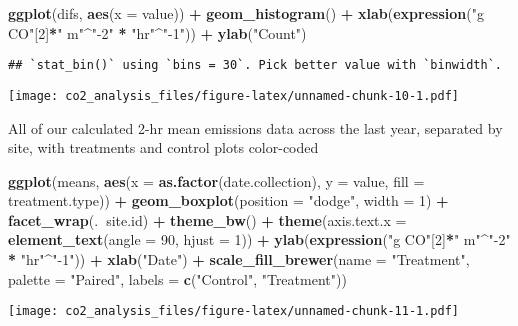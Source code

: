 \documentclass[]{article}
\newenvironment{Shaded}{\begin{snugshade}}{\end{snugshade}}
\newcommand{\KeywordTok}[1]{\textcolor[rgb]{0.13,0.29,0.53}{\textbf{#1}}}
\newcommand{\DataTypeTok}[1]{\textcolor[rgb]{0.13,0.29,0.53}{#1}}
\newcommand{\DecValTok}[1]{\textcolor[rgb]{0.00,0.00,0.81}{#1}}
\newcommand{\StringTok}[1]{\textcolor[rgb]{0.31,0.60,0.02}{#1}}
\newcommand{\OperatorTok}[1]{\textcolor[rgb]{0.81,0.36,0.00}{\textbf{#1}}}
\newcommand{\NormalTok}[1]{#1}
\begin{document}
\begin{Shaded}
\begin{Highlighting}[]
\KeywordTok{ggplot}\NormalTok{(difs, }\KeywordTok{aes}\NormalTok{(}\DataTypeTok{x =}\NormalTok{ value)) }\OperatorTok{+}
\StringTok{  }\KeywordTok{geom_histogram}\NormalTok{() }\OperatorTok{+}
\StringTok{  }\KeywordTok{xlab}\NormalTok{(}\KeywordTok{expression}\NormalTok{(}\StringTok{"g CO"}\NormalTok{[}\DecValTok{2}\NormalTok{]}\OperatorTok{*}\StringTok{" m"}\OperatorTok{^}\StringTok{"-2"} \OperatorTok{*}\StringTok{ "hr"}\OperatorTok{^}\StringTok{"-1"}\NormalTok{)) }\OperatorTok{+}
\StringTok{  }\KeywordTok{ylab}\NormalTok{(}\StringTok{"Count"}\NormalTok{)}
\end{Highlighting}
\end{Shaded}

\begin{verbatim}
## `stat_bin()` using `bins = 30`. Pick better value with `binwidth`.
\end{verbatim}

\texttt{[image: co2\_analysis\_files/figure-latex/unnamed-chunk-10-1.pdf]}

All of our calculated 2-hr mean emissions data across the last year,
separated by site, with treatments and control plots color-coded

\begin{Shaded}
\begin{Highlighting}[]
\KeywordTok{ggplot}\NormalTok{(means, }\KeywordTok{aes}\NormalTok{(}\DataTypeTok{x =} \KeywordTok{as.factor}\NormalTok{(date.collection), }\DataTypeTok{y =}\NormalTok{ value, }\DataTypeTok{fill =}\NormalTok{ treatment.type)) }\OperatorTok{+}
\StringTok{  }\KeywordTok{geom_boxplot}\NormalTok{(}\DataTypeTok{position =} \StringTok{"dodge"}\NormalTok{, }\DataTypeTok{width =} \DecValTok{1}\NormalTok{) }\OperatorTok{+}
\StringTok{  }\KeywordTok{facet_wrap}\NormalTok{(.}\OperatorTok{~}\NormalTok{site.id) }\OperatorTok{+}
\StringTok{  }\KeywordTok{theme_bw}\NormalTok{() }\OperatorTok{+}
\StringTok{  }\KeywordTok{theme}\NormalTok{(}\DataTypeTok{axis.text.x =} \KeywordTok{element_text}\NormalTok{(}\DataTypeTok{angle =} \DecValTok{90}\NormalTok{, }\DataTypeTok{hjust =} \DecValTok{1}\NormalTok{)) }\OperatorTok{+}
\StringTok{  }\KeywordTok{ylab}\NormalTok{(}\KeywordTok{expression}\NormalTok{(}\StringTok{"g CO"}\NormalTok{[}\DecValTok{2}\NormalTok{]}\OperatorTok{*}\StringTok{" m"}\OperatorTok{^}\StringTok{"-2"} \OperatorTok{*}\StringTok{ "hr"}\OperatorTok{^}\StringTok{"-1"}\NormalTok{)) }\OperatorTok{+}
\StringTok{  }\KeywordTok{xlab}\NormalTok{(}\StringTok{"Date"}\NormalTok{) }\OperatorTok{+}
\StringTok{  }\KeywordTok{scale_fill_brewer}\NormalTok{(}\DataTypeTok{name =} \StringTok{"Treatment"}\NormalTok{, }\DataTypeTok{palette =} \StringTok{"Paired"}\NormalTok{, }\DataTypeTok{labels =} \KeywordTok{c}\NormalTok{(}\StringTok{"Control"}\NormalTok{, }\StringTok{"Treatment"}\NormalTok{))}
\end{Highlighting}
\end{Shaded}

\texttt{[image: co2\_analysis\_files/figure-latex/unnamed-chunk-11-1.pdf]}
\end{document}
